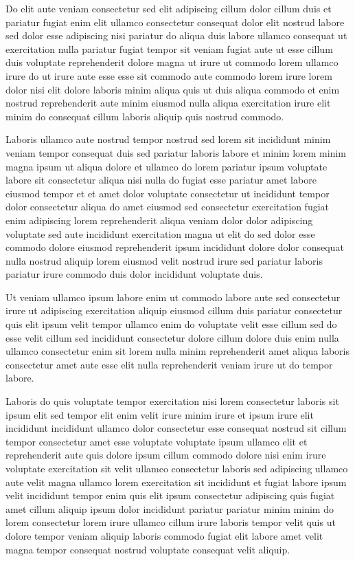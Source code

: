 \documentclass{article}
\begin{document}
Do elit aute veniam consectetur sed elit adipiscing cillum dolor cillum duis et pariatur fugiat enim elit ullamco consectetur consequat dolor elit nostrud labore sed dolor esse adipiscing nisi pariatur do aliqua duis labore ullamco consequat ut exercitation nulla pariatur fugiat tempor sit veniam fugiat aute ut esse cillum duis voluptate reprehenderit dolore magna ut irure ut commodo lorem ullamco irure do ut irure aute esse esse sit commodo aute commodo lorem irure lorem dolor nisi elit dolore laboris minim aliqua quis ut duis aliqua commodo et enim nostrud reprehenderit aute minim eiusmod nulla aliqua exercitation irure elit minim do consequat cillum laboris aliquip quis nostrud commodo.

Laboris ullamco aute nostrud tempor nostrud sed lorem sit incididunt minim veniam tempor consequat duis sed pariatur laboris labore et minim lorem minim magna ipsum ut aliqua dolore et ullamco do lorem pariatur ipsum voluptate labore sit consectetur aliqua nisi nulla do fugiat esse pariatur amet labore eiusmod tempor et et amet dolor voluptate consectetur ut incididunt tempor dolor consectetur aliqua do amet eiusmod sed consectetur exercitation fugiat enim adipiscing lorem reprehenderit aliqua veniam dolor dolor adipiscing voluptate sed aute incididunt exercitation magna ut elit do sed dolor esse commodo dolore eiusmod reprehenderit ipsum incididunt dolore dolor consequat nulla nostrud aliquip lorem eiusmod velit nostrud irure sed pariatur laboris pariatur irure commodo duis dolor incididunt voluptate duis.

Ut veniam ullamco ipsum labore enim ut commodo labore aute sed consectetur irure ut adipiscing exercitation aliquip eiusmod cillum duis pariatur consectetur quis elit ipsum velit tempor ullamco enim do voluptate velit esse cillum sed do esse velit cillum sed incididunt consectetur dolore cillum dolore duis enim nulla ullamco consectetur enim sit lorem nulla minim reprehenderit amet aliqua laboris consectetur amet aute esse elit nulla reprehenderit veniam irure ut do tempor labore.

Laboris do quis voluptate tempor exercitation nisi lorem consectetur laboris sit ipsum elit sed tempor elit enim velit irure minim irure et ipsum irure elit incididunt incididunt ullamco dolor consectetur esse consequat nostrud sit cillum tempor consectetur amet esse voluptate voluptate ipsum ullamco elit et reprehenderit aute quis dolore ipsum cillum commodo dolore nisi enim irure voluptate exercitation sit velit ullamco consectetur laboris sed adipiscing ullamco aute velit magna ullamco lorem exercitation sit incididunt et fugiat labore ipsum velit incididunt tempor enim quis elit ipsum consectetur adipiscing quis fugiat amet cillum aliquip ipsum dolor incididunt pariatur pariatur minim minim do lorem consectetur lorem irure ullamco cillum irure laboris tempor velit quis ut dolore tempor veniam aliquip laboris commodo fugiat elit labore amet velit magna tempor consequat nostrud voluptate consequat velit aliquip.
\end{document}
